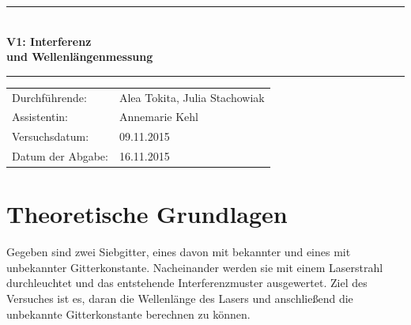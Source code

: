\documentclass[12pt,a4paper,titlepage,headinclude,bibtotoc]{scrartcl}
\begin{document}
\begin{titlepage}
\centering

\vspace*{3cm}

\rule{\textwidth}{1pt}\\[0.5cm]
{\huge \bfseries
  V1: Interferenz\\[1.5ex]
  und Wellenlängenmessung}\\[0.5cm]
\rule{\textwidth}{1pt}

\vspace*{3cm}


\begin{Large}
\begin{tabular}{ll}
Durchführende: &  Alea Tokita, Julia Stachowiak\\
Assistentin: & Annemarie Kehl\\
 Versuchsdatum: & 09.11.2015\\
 Datum der Abgabe: & 16.11.2015\\
\end{tabular}
\end{Large}

\vspace*{2.5cm}

\begin{Large}
\end{Large}

\end{titlepage}

\tableofcontents

\newpage




\section{Theoretische Grundlagen}
Gegeben sind zwei Siebgitter, eines davon mit bekannter und eines mit unbekannter Gitterkonstante. Nacheinander werden sie mit einem Laserstrahl durchleuchtet und das entstehende Interferenzmuster ausgewertet. Ziel des Versuches ist es, daran die Wellenlänge des Lasers und anschließend die unbekannte Gitterkonstante berechnen zu können.
\end{document}
